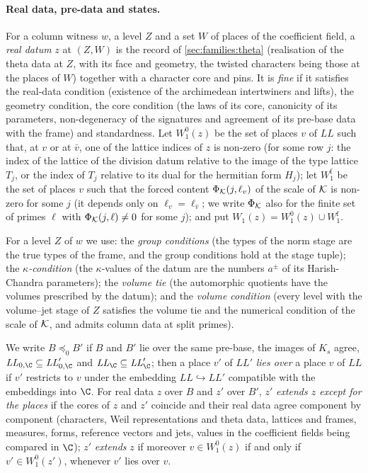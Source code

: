\paragraph{Real data, pre-data and states.}
For a column witness $w$, a level $Z$ and a set $W$ of places of the coefficient field, a \emph{real datum} $z$ at $(Z,W)$ is the record
of \cref{sec:families:theta} (realisation of the theta data at $Z$, with its face and geometry, the twisted characters being those at the
places of $W$) together with a character core and pins. It is \emph{fine} if it satisfies the real-data condition (existence of the
archimedean intertwiners and lifts), the geometry condition, the core condition (the laws of its core, canonicity of its parameters,
non-degeneracy of the signatures and agreement of its pre-base data with the frame) and standardness. Let $W_1^0(z)$ be the set of places
$v$ of $\mathit{LL}$ such that, at $v$ or at $\bar v$, one of the lattice indices of $z$ is non-zero (for some row $j$: the index of the
lattice of the division datum relative to the image of the type lattice $T_j$, or the index of $T_j$ relative to its dual for the hermitian
form $H_j$); let $W_1^{\mathrm f}$ be the set of places $v$ such that the forced content $\Phi_\mathcal K(j,\ell_v)$ of the scale of $\mathcal K$ is
non-zero for some $j$ (it depends only on $\ell_v=\ell_{\bar v}$; we write $\Phi_\mathcal K$ also for the finite set of primes $\ell$ with
$\Phi_\mathcal K(j,\ell)\neq0$ for some $j$); and put $W_1(z)=W_1^0(z)\cup W_1^{\mathrm f}$.

For a level $Z$ of $w$ we use: the \emph{group conditions} (the types of the norm stage are the true types of the frame, and the group
conditions hold at the stage tuple); the \emph{$\kappa$-condition} (the $\kappa$-values of the datum are the numbers $a^{\pm}$ of its
Harish-Chandra parameters); the \emph{volume tie} (the automorphic quotients have the volumes prescribed by the datum); and the
\emph{volume condition} (every level with the volume--jet stage of $Z$ satisfies the volume tie and the numerical condition of the scale
of $\mathcal K$, and admits column data at split primes).

We write $B\preceq_0B'$ if $B$ and $B'$ lie over the same pre-base, the images of $K_s$ agree, $\mathit{LL}_{0,\C}\subseteq
\mathit{LL}'_{0,\C}$ and $\mathit{LL}_\C\subseteq\mathit{LL}'_\C$; then a place $v'$ of $\mathit{LL}'$ \emph{lies over} a place $v$ of
$\mathit{LL}$ if $v'$ restricts to $v$ under the embedding $\mathit{LL}\hookrightarrow\mathit{LL}'$ compatible with the embeddings into
$\C$. For real data $z$ over $B$ and $z'$ over $B'$, $z'$ \emph{extends $z$ except for the places} if the cores of $z$ and $z'$ coincide
and their real data agree component by component (characters, Weil representations and theta data, lattices and frames, measures, forms,
reference vectors and jets, values in the coefficient fields being compared in $\C$); $z'$ \emph{extends} $z$ if moreover $v\in W_1^0(z)$
if and only if $v'\in W_1^0(z')$, whenever $v'$ lies over $v$.

